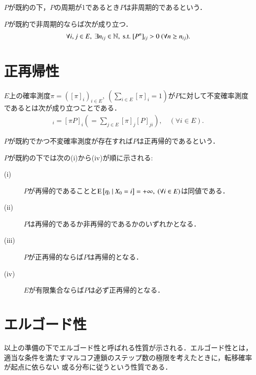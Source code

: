 	\begin{dfn}[非周期性]
		$P$が既約の下，$P$の周期が1であるとき$P$は非周期的であるという．
	\end{dfn}
	
	\begin{prp}[非周期性に関する一命題]
		$P$が既約で非周期的ならば次が成り立つ．
		\begin{align}
			\forall i,j \in E,\ \exists n_{ij} \in \N,\ \mathrm{s.t.}\ [P^n]_{ij} > 0 \ (\forall n \geq n_{ij}).
		\end{align}
	\end{prp}

\section{正再帰性}
	\begin{dfn}[不変確率測度]
		$E$上の確率測度$\pi = ([\pi]_i)_{i \in E},\ (\sum_{i \in E} [\pi]_i = 1)$が$P$に対して不変確率測度であるとは次が成り立つことである．
		\begin{align}
			[\pi]_i = [\pi P]_i ( = \sum_{j \in E}[\pi]_j [P]_{ji} ), \quad (\forall i \in E).
		\end{align}
	\end{dfn}
	
	\begin{dfn}[正再帰性]
		$P$が既約でかつ不変確率測度が存在すれば$P$は正再帰的であるという． 
	\end{dfn}
	
	\begin{prp}
		$P$が既約の下では次の(i)から(iv)が順に示される:
		\begin{description}
			\item[\rm{(i)}] $P$が再帰的であることと$\operatorname{E} \left[ \eta_i \ \middle|\ X_0 = i \right] = +\infty, \ (\forall i \in E)$は同値である．
			\item[\rm{(ii)}] $P$は再帰的であるか非再帰的であるかのいずれかとなる．
			\item[\rm{(iii)}] $P$が正再帰的ならば$P$は再帰的となる．
			\item[\rm{(iv)}] $E$が有限集合ならば$P$は必ず正再帰的となる．
		\end{description}
	\end{prp}


\section{エルゴード性}
	\label{sec:ergodic}
	以上の準備の下でエルゴード性と呼ばれる性質が示される．エルゴード性とは，適当な条件を満たすマルコフ連鎖のステップ数の極限を考えたときに，転移確率が起点に依らない
	或る分布に従うという性質である．
	

